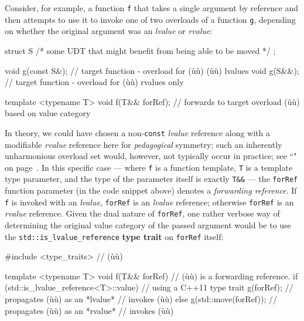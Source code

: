 Consider, for example, a function \texttt{f} that takes a single
argument by reference and then attempts to use it to invoke one of two
overloads of a function \texttt{g}, depending on whether the original
argument was an \emph{lvalue} or \emph{rvalue}:

\begin{emcppslisting}
struct S { /* some UDT that might benefit from being able to be moved */ };

void g(const S&);  // target function - overload for (ù{}ù) (ù{}ù) lvalues
void g(S&&);       // target function - overload for (ù{}ù) rvalues only

template <typename T>
void f(T&& forRef); // forwards to target overload (ù{}ù) based on value category
\end{emcppslisting}

\noindent In
theory, we could have chosen a non-\texttt{const} \emph{lvalue}
reference along with a modifiable \emph{rvalue} reference here for
\emph{pedagogical} symmetry; such an inherently unharmonious overload
set would, however, not typically occur in practice; see ``" on page~\pageref{Rvalue-References}. In this specific case --- where \texttt{f} is a function template,
\texttt{T} is a template type parameter, and the type of the parameter
itself is exactly \texttt{T\&\&} --- the \texttt{forRef} function
parameter (in the code snippet above) denotes a \emph{forwarding reference}. If \texttt{f}\label{f-invoked-example}
is invoked with an \emph{lvalue}, \texttt{forRef} is an \emph{lvalue}
reference; otherwise \texttt{forRef} is an \emph{rvalue} reference.
Given the dual nature of \texttt{forRef}, one rather verbose way of
determining the original value category of the passed argument would be
to use the \texttt{std::is\_lvalue\_reference} \textbf{type trait} on
\texttt{forRef} itself:

\begin{emcppslisting}
#include <type_traits>  // (ù{}ù)

template <typename T>
void f(T&& forRef)      // (ù{}ù) is a forwarding reference.
{
    if (std::is_lvalue_reference<T>::value)  // using a C++11 type trait
    {
        g(forRef);             // propagates (ù{}ù) as an *lvalue*
    }                          // invokes (ù{}ù)
    else
    {
        g(std::move(forRef));  // propagates (ù{}ù) as an *rvalue*
    }                          // invokes (ù{}ù)
}
\end{emcppslisting}

